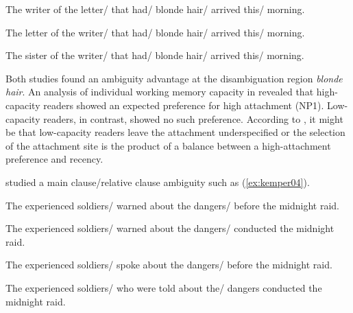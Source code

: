 \documentclass{cambridge7A}\usepackage[]{graphicx}\usepackage[]{color}
\begin{document}
\begin{exe}
\ex\label{ex:traxler07}
\begin{xlist}
\item The writer of the letter/ that had/ blonde hair/ arrived this/ morning.
\item The letter of the writer/ that had/ blonde hair/ arrived this/ morning.
\item The sister of the writer/ that had/ blonde hair/ arrived this/ morning.
\end{xlist}
\end{exe}

Both studies found an ambiguity advantage at the disambiguation region \textit{blonde hair}. An analysis of individual working memory capacity in \cite{Traxler2007} revealed that high-capacity readers showed an expected preference for high attachment (NP1). 
Low-capacity readers, in contrast, showed no such preference. According to \cite{Traxler2007}, it might be that low-capacity readers leave the attachment underspecified or the selection of the attachment site is the product of a balance between a high-attachment preference and recency.




\cite{KemperCrowKemtes2004} studied a main clause/relative clause ambiguity such as (\ref{ex:kemper04}). 

\begin{exe}
\ex\label{ex:kemper04}
\begin{xlist}
\item The experienced soldiers/ warned about the dangers/ before the midnight raid.
\item The experienced soldiers/ warned about the dangers/ conducted the midnight raid.
\item The experienced soldiers/ spoke about the dangers/ before the midnight raid.
\item The experienced soldiers/ who were told about the/ dangers conducted the midnight raid.
\end{xlist}
\end{exe}
\end{document}
